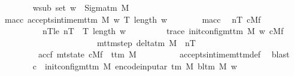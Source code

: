 \begin{isabellebody}
\ \ \ \ \ \ \isamarkupfalse%
\ w{\isacharunderscore}{\kern0pt}sub{\isacharcolon}{\kern0pt}\ {\isachardoublequoteopen}set\ w\ {\isasymsubseteq}\ Sigma{\isacharunderscore}{\kern0pt}tm\ M{\isachardoublequoteclose}\isanewline
\ \ \ \ \ \ \isamarkupfalse%
\ m{\isacharunderscore}{\kern0pt}acc{\isacharcolon}{\kern0pt}\ {\isachardoublequoteopen}accepts{\isacharunderscore}{\kern0pt}in{\isacharunderscore}{\kern0pt}time{\isacharunderscore}{\kern0pt}mttm\ M\ w\ {\isacharparenleft}{\kern0pt}T\ {\isacharparenleft}{\kern0pt}length\ w{\isacharparenright}{\kern0pt}{\isacharparenright}{\kern0pt}{\isachardoublequoteclose}\isanewline
\ \ \ \ \ \ \isamarkupfalse%
\ m{\isacharunderscore}{\kern0pt}acc\ \isamarkupfalse%
\ n{\isacharunderscore}{\kern0pt}T\ cMf\ \isanewline
\ \ \ \ \ \ \ \ \ \ nT{\isacharunderscore}{\kern0pt}le{\isacharcolon}{\kern0pt}\ {\isachardoublequoteopen}n{\isacharunderscore}{\kern0pt}T\ {\isasymle}\ T\ {\isacharparenleft}{\kern0pt}length\ w{\isacharparenright}{\kern0pt}{\isachardoublequoteclose}\isanewline
\ \ \ \ \ \ \ \ \ trace{\isacharcolon}{\kern0pt}\ {\isachardoublequoteopen}{\isacharparenleft}{\kern0pt}init{\isacharunderscore}{\kern0pt}config{\isacharunderscore}{\kern0pt}mttm\ M\ w{\isacharcomma}{\kern0pt}\ cMf{\isacharparenright}{\kern0pt}\isanewline
\ \ \ \ \ \ \ \ \ \ \ \ \ \ \ \ \ \ \ \ \ \ {\isasymin}\ {\isacharparenleft}{\kern0pt}mttm{\isacharunderscore}{\kern0pt}step\ {\isacharparenleft}{\kern0pt}delta{\isacharunderscore}{\kern0pt}tm\ M{\isacharparenright}{\kern0pt}{\isacharparenright}{\kern0pt}\ {\isacharcircum}{\kern0pt}{\isacharcircum}{\kern0pt}\ n{\isacharunderscore}{\kern0pt}T{\isachardoublequoteclose}\isanewline
\ \ \ \ \ \ \ \ \ accf{\isacharcolon}{\kern0pt}\ {\isachardoublequoteopen}mt{\isacharunderscore}{\kern0pt}state\ cMf\ {\isacharequal}{\kern0pt}\ t{\isacharunderscore}{\kern0pt}tm\ M{\isachardoublequoteclose}\isanewline
\ \ \ \ \ \ \ \ \isamarkupfalse%
\ accepts{\isacharunderscore}{\kern0pt}in{\isacharunderscore}{\kern0pt}time{\isacharunderscore}{\kern0pt}mttm{\isacharunderscore}{\kern0pt}def\ \isamarkupfalse%
\ blast\isanewline
\ \ \ \ \ \ \isamarkupfalse%
\ {\isacharquery}{\kern0pt}c{\isacharprime}{\kern0pt}\ {\isacharequal}{\kern0pt}\ {\isachardoublequoteopen}init{\isacharunderscore}{\kern0pt}config{\isacharunderscore}{\kern0pt}mttm\ {\isacharquery}{\kern0pt}M{\isacharprime}{\kern0pt}\ {\isacharparenleft}{\kern0pt}encode{\isacharunderscore}{\kern0pt}input{\isacharunderscore}{\kern0pt}ar\ {\isacharparenleft}{\kern0pt}{\isasymGamma}{\isacharunderscore}{\kern0pt}tm\ M{\isacharparenright}{\kern0pt}\ {\isacharparenleft}{\kern0pt}bl{\isacharunderscore}{\kern0pt}tm\ M{\isacharparenright}{\kern0pt}\ w{\isacharparenright}{\kern0pt}{\isachardoublequoteclose}\isanewline

\end{isabellebody}
